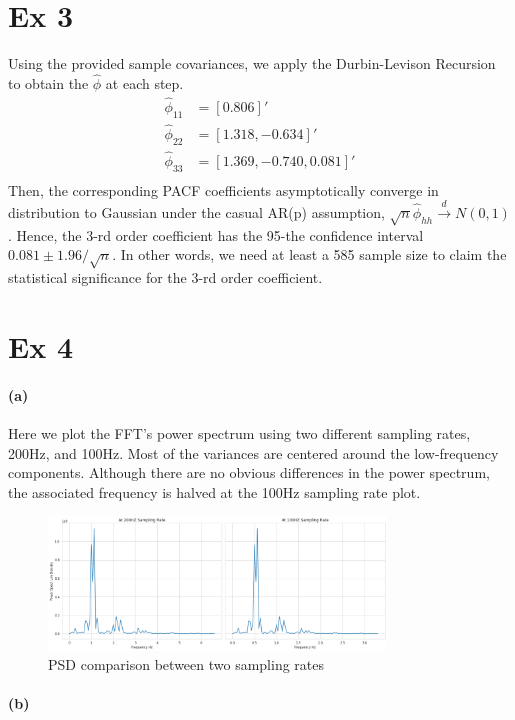 \documentclass[11pt, letterpaper]{article}
\begin{document}
\section{Ex 3}
Using the provided sample covariances, we apply the Durbin-Levison Recursion to obtain the $\hat{\phi}$ at each step.
\begin{align*}
    \hat{\phi}_{11} &= [0.806]' \\
    \hat{\phi}_{22} &= [1.318, -0.634]' \\
    \hat{\phi}_{33} &= [1.369, -0.740, 0.081]' \\
\end{align*}
Then, the corresponding PACF coefficients asymptotically converge in distribution to Gaussian under the casual AR(p) assumption, $\sqrt{n}\hat{\phi}_{hh} \xrightarrow{d} N(0,1)$. Hence, the 3-rd order coefficient has the 95-the confidence interval $0.081 \pm 1.96/\sqrt{n}$. In other words, we need at least a 585 sample size to claim the statistical significance for the 3-rd order coefficient.

\newpage
\section{Ex 4}
\paragraph{(a)}
Here we plot the FFT's power spectrum using two different sampling rates, 200Hz, and 100Hz. Most of the variances are centered around the low-frequency components. Although there are no obvious differences in the power spectrum, the associated frequency is halved at the 100Hz sampling rate plot.
\begin{figure}[!h]
  \centering
  \includegraphics[width=0.8\textwidth]{4-1.png}
  \captionsetup{justification=centering}
  \caption{PSD comparison between two sampling rates}
\end{figure}

\paragraph{(b)}
\end{document}
